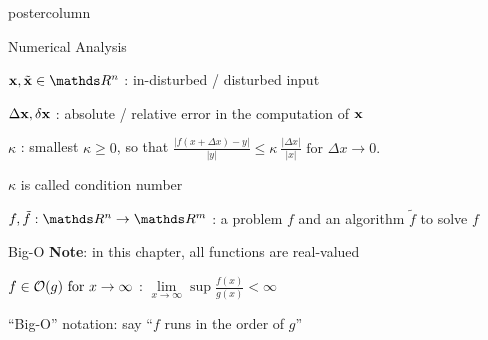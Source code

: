 \documentclass{beamer}
\newlength{\columnheight} %
\begin{document}
\begin{frame}[fragile]{}
\begin{columns}
	\begin{column}{.31\textwidth}
		\begin{beamercolorbox}[center]{postercolumn}
			\begin{minipage}{.98\textwidth}
				\parbox[t][\columnheight]{\textwidth}{
					\vspace{1cm}
					\begin{myblock}{Numerical Analysis}
						\begin{codebox}
							$\xv, \tilde \xv \in \R^n$ : in-disturbed / disturbed input
						\end{codebox}
						\hspace*{1ex}
						\begin{codebox}
							$\Delta \mathbf{x}, \delta \mathbf{x}$ : absolute / relative error in the computation of $\mathbf{x}$
						\end{codebox}
						\hspace*{1ex}
						\begin{codebox}
						$\kappa$ : smallest $\kappa \geq 0$, so that
						$\frac{|f(x+\Delta x)-y|}{|y|} \leq \kappa \ \frac{|\Delta x|}{|x|} \text{ for } \Delta x \to 0.$
						\end{codebox}
						\hspace*{1ex} $\kappa$ is called condition number\\
						\begin{codebox}
							$f, \tilde f: \R^n \to \R^m$ : a problem $f$ and an algorithm $\tilde f$ to solve $f$
						\end{codebox}
					\end{myblock}
					\begin{myblock}{Big-O}
						\textbf{Note}: in this chapter, all functions are real-valued 
						\vspace*{3ex}
						\begin{codebox}
							$f \in \mathcal{O}(g) \text{ for } x \to \infty$ : $\lim\limits_{x \to \infty} \sup \frac{f(x)}{g(x)} < \infty$
						\end{codebox}
						\hspace*{1ex} \enquote{Big-O} notation: say \enquote{$f$ runs in the order of $g$} \\

\end{myblock}}
\end{minipage}
\end{beamercolorbox}
\end{column}
\end{columns}
\end{frame}
\end{document}
